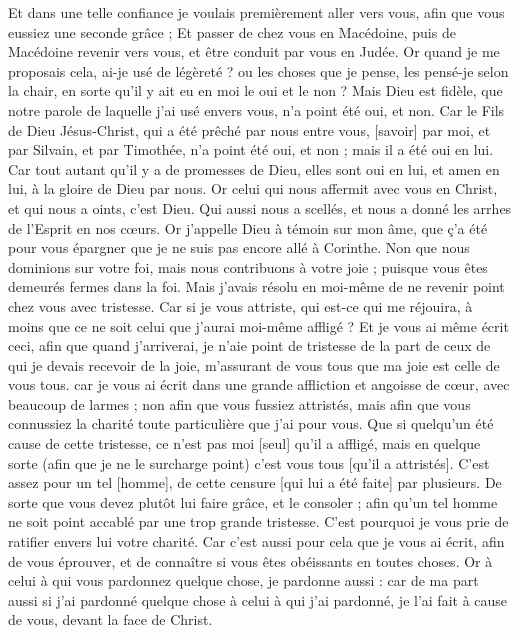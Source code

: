 \begin{multicols}{2}
Et dans une telle confiance je voulais premièrement aller vers vous, afin que vous eussiez une seconde grâce ;
Et passer de chez vous en Macédoine, puis de Macédoine revenir vers vous, et être conduit par vous en Judée.
Or quand je me proposais cela, ai-je usé de légèreté ? ou les choses que je pense, les pensé-je selon la chair, en sorte qu'il y ait eu en moi le oui et le non ?
Mais Dieu est fidèle, que notre parole de laquelle j'ai usé envers vous, n'a point été oui, et non.
Car le Fils de Dieu Jésus-Christ, qui a été prêché par nous entre vous, [savoir] par moi, et par Silvain, et par Timothée, n'a point été oui, et non ; mais il a été oui en lui.
Car tout autant qu'il y a de promesses de Dieu, elles sont oui en lui, et amen en lui, à la gloire de Dieu par nous.
Or celui qui nous affermit avec vous en Christ, et qui nous a oints, c'est Dieu.
Qui aussi nous a scellés, et nous a donné les arrhes de l'Esprit en nos cœurs.
Or j'appelle Dieu à témoin sur mon âme, que ç'a été pour vous épargner que je ne suis pas encore allé à Corinthe.
Non que nous dominions sur votre foi, mais nous contribuons à votre joie ; puisque vous êtes demeurés fermes dans la foi.
\VerseOne{}Mais j'avais résolu en moi-même de ne revenir point chez vous avec tristesse.
Car si je vous attriste, qui est-ce qui me réjouira, à moins que ce ne soit celui que j'aurai moi-même affligé ?
Et je vous ai même écrit ceci, afin que quand j'arriverai, je n'aie point de tristesse de la part de ceux de qui je devais recevoir de la joie, m'assurant de vous tous que ma joie est celle de vous tous.
car je vous ai écrit dans une grande affliction et angoisse de cœur, avec beaucoup de larmes ; non afin que vous fussiez attristés, mais afin que vous connussiez la charité toute particulière que j'ai pour vous.
Que si quelqu'un été cause de cette tristesse, ce n'est pas moi [seul] qu'il a affligé, mais en quelque sorte (afin que je ne le surcharge point) c'est vous tous [qu'il a attristés].
C'est assez pour un tel [homme], de cette censure [qui lui a été faite] par plusieurs.
De sorte que vous devez plutôt lui faire grâce, et le consoler ; afin qu'un tel homme ne soit point accablé par une trop grande tristesse.
C'est pourquoi je vous prie de ratifier envers lui votre charité.
Car c'est aussi pour cela que je vous ai écrit, afin de vous éprouver, et de connaître si vous êtes obéissants en toutes choses.
Or à celui à qui vous pardonnez quelque chose, je pardonne aussi : car de ma part aussi si j'ai pardonné quelque chose à celui à qui j'ai pardonné, je l'ai fait à cause de vous, devant la face de Christ.

\end{multicols}
